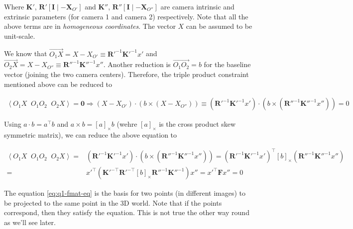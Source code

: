 Where $\mathbf{K}'$, $\mathbf{R}' \left [ \mathbf{I} \mid -\mathbf{X}_{O'} \right ]$ and $\mathbf{K}''$, $\mathbf{R}'' \left [ \mathbf{I} \mid -\mathbf{X}_{O''} \right ]$ are camera intrinsic and extrinsic parameters (for camera 1 and camera 2) respectively. Note that all the above terms are in \textit{homogeneous coordinates}. The vector $X$ can be assumed to be unit-scale.

We know that $\overrightarrow{O_1 X} = X - X_{O'} \equiv \mathbf{R}'^{-1} \mathbf{K}'^{-1} x'$ and $\overrightarrow{O_2 X} = X - X_{O''} \equiv \mathbf{R}''^{-1} \mathbf{K}''^{-1} x''$. Another reduction is $\overrightarrow{O_1 O_2} = b$ for the baseline vector (joining the two camera centers). Therefore, the triple product constraint mentioned above can be reduced to

\begin{align}
    \left \langle O_1 X \;\; O_1 O_2 \;\; O_2 X \right \rangle = \mathbf{0}
    \Rightarrow \left ( X - X_{O'} \right ) \cdot \left ( b \times \left ( X - X_{O''} \right ) \right ) 
    \equiv \left ( \mathbf{R}'^{-1} \mathbf{K}'^{-1} x' \right ) \cdot \left ( b \times \left ( \mathbf{R}''^{-1} \mathbf{K}''^{-1} x'' \right ) \right ) = 0
    \nonumber
\end{align}

Using $a \cdot b = a^\top b$ and $a \times b = \left [ a \right ]_\times b$ (wehre $\left [ a \right ]_\times$ is the cross product skew symmetric matrix), we can reduce the above equation to

\begin{align}
    \left \langle O_1 X \;\; O_1 O_2 \;\; O_2 X \right \rangle =& \left ( \mathbf{R}'^{-1} \mathbf{K}'^{-1} x' \right ) \cdot \left ( b \times \left ( \mathbf{R}''^{-1} \mathbf{K}''^{-1} x'' \right ) \right ) =
        \left ( \mathbf{R}'^{-1} \mathbf{K}'^{-1} x' \right )^\top \left [ b \right ]_\times \left ( \mathbf{R}''^{-1} \mathbf{K}''^{-1} x'' \right )
    \nonumber \\
    =& x'^\top \left ( \mathbf{K}'^{-\top} \mathbf{R}'^{-\top} \left [ b \right ]_\times \mathbf{R}''^{-1} \mathbf{K}''^{-1} \right ) x'' = x'^\top \mathbf{F} x'' = 0
    \label{eq:q1-fmat-eq}
\end{align}

The equation \ref{eq:q1-fmat-eq} is the basis for two points (in different images) to be projected to the same point in the 3D world. Note that if the points correspond, then they satisfy the equation. This is not true the other way round as we'll see later.






